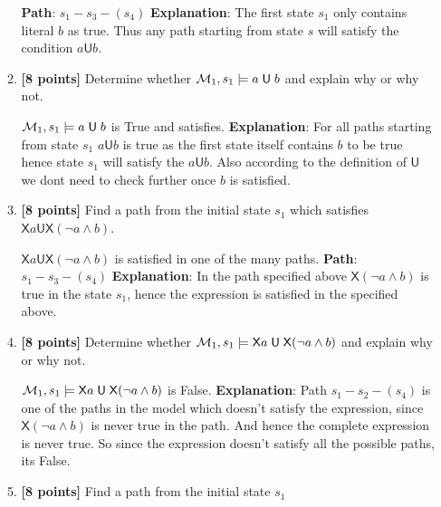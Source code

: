 \documentclass{article}
\def\NextX{\mathord{\mathsf{X}}}
\def\Until{\mathrel{\mathsf{U}}}
\begin{document}
\begin{itemize}
\begin{enumerate}
\begin{answer}
    	\textbf{Path}: $s_1-s_3-(s_4)$	\newline
    	\textbf{Explanation}: The first state $s_1$ only contains literal $b$ as
    	true. Thus any path starting from state $s$ will satisfy the condition $a
    	\Until b$.
    \end{answer}
    \bigskip
  \item \textbf{[8 points]} Determine whether ${\cal M}_1, s_1 \models
    a \Until b$ and explain why or why not.
    \begin{answer}
    	${\cal M}_1, s_1 \models a \Until b$ is True and satisfies.	\newline
    	\textbf{Explanation}: For all paths starting from state $s_1$ $a \Until b$
    	is true as the first state itself contains $b$ to be true hence state $s_1$
    	will satisfy the $a \Until b$. Also according to the definition of $\Until$
    	we dont need to check further once $b$ is satisfied.
    \end{answer}
    \bigskip
  \item \textbf{[8 points]} Find a path from the initial state $s_1$
    which satisfies $\NextX a \Until \NextX (\neg a \land b)$.
    \begin{answer}
    	$\NextX a \Until \NextX (\neg a \land b)$ is satisfied in one of the many
    	paths.	\newline
    	\textbf{Path}: $s_1-s_3-(s_4)$	\newline
    	\textbf{Explanation}: In the path specified above $\NextX (\neg a \land b)$
    	is true in the state $s_1$, hence the expression is satisfied in the
    	specified above.
    \end{answer}
    \bigskip
  \item \textbf{[8 points]} Determine whether ${\cal M}_1, s_1 \models
    \NextX a \Until \NextX (\neg a \land b)$ and explain why or why not.
    \begin{answer}
    	${\cal M}_1, s_1 \models \NextX a \Until \NextX (\neg a \land b)$ is False.
    	\newline \textbf{Explanation}: Path $s_1-s_2-(s_4)$ is one of the paths in
    	the model which doesn't satisfy the expression, since $\NextX (\neg a \land
    	b)$ is never true in the path. And hence the complete expression is never
    	true. So since the expression doesn't satisfy all the possible paths, its
    	False.
    \end{answer}
    \bigskip
  \item \textbf{[8 points]} Find a path from the initial state $s_1$

\end{enumerate}
\end{itemize}
\end{document}
